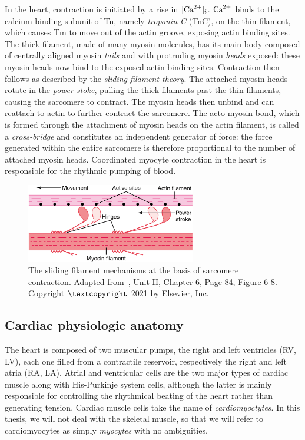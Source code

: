 \vspace{0.2cm}
In the heart, contraction is initiated by a rise in $[\textrm{Ca}^{2+}]_{i}$. $\textrm{Ca}^{2+}$ binds to the calcium-binding subunit of Tn, namely \textit{troponin C} (\acs{TnC}), on the thin filament, which causes Tm to move out of the actin groove, exposing actin binding sites. The thick filament, made of many myosin molecules, has its main body composed of centrally aligned myosin \textit{tails} and with protruding myosin \textit{heads} exposed: these myosin heads now bind to the exposed actin binding sites. Contraction then follows as described by the \textit{sliding filament theory}. The attached myosin heads rotate in the \textit{power stoke}, pulling the thick filaments past the thin filaments, causing the sarcomere to contract. The myosin heads then unbind and can reattach to actin to further contract the sarcomere. The acto-myosin bond, which is formed through the attachment of myosin heads on the actin filament, is called a \textit{cross-bridge} and constitutes an independent generator of force: the force generated within the entire sarcomere is therefore proportional to the number of attached myosin heads. Coordinated myocyte contraction in the heart is responsible for the rhythmic pumping of blood.

\begin{figure}[ht!]
    \myfloatalign
    \includegraphics[width=0.66\textwidth]{figures/chapter01/fig10.png}
    \caption{The sliding filament mechanisms at the basis of sarcomere contraction. Adapted from~\cite{Guyton:2021}, Unit II, Chapter 6, Page 84, Figure 6-8. Copyright $\textcopyright$ 2021 by Elsevier, Inc.}
    \label{fig:powerstroke}
\end{figure}


%
%
%
\subsection{Cardiac physiologic anatomy}\label{sec:ch1cardiac_physiologic_anatomy}
The heart is composed of two muscular pumps, the right and left ventricles (\acs{RV}, \acs{LV}), each one filled from a contractile reservoir, respectively the right and left atria (\acs{RA}, \acs{LA}). Atrial and ventricular cells are the two major types of cardiac muscle along with His-Purkinje system cells, although the latter is mainly responsible for controlling the rhythmical beating of the heart rather than generating tension. Cardiac muscle cells take the name of \textit{cardiomyoctytes}. In this thesis, we will not deal with the skeletal muscle, so that we will refer to cardiomyocytes as simply \textit{myocytes} with no ambiguities.

